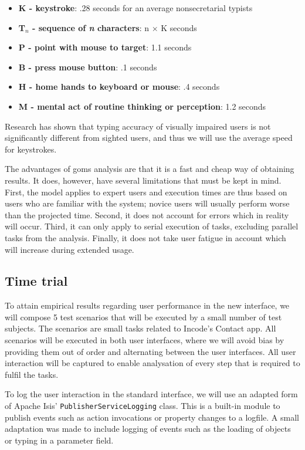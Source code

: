\begin{itemize}
	\item \textbf{K - keystroke}: .28 seconds for an average nonsecretarial typists
	\item \textbf{T$_n$ - sequence of \textit{n} characters}: n $\times$ K seconds
	\item \textbf{P - point with mouse to target}: 1.1 seconds
	\item \textbf{B - press mouse button}: .1 seconds
	\item \textbf{H - home hands to keyboard or mouse}: .4 seconds
	\item \textbf{M - mental act of routine thinking or perception}: 1.2 seconds
\end{itemize}

Research has shown that typing accuracy of visually impaired users is not significantly different from sighted users\cite{ishida1993accuracy}, and thus we will use the average speed for keystrokes.

The advantages of \acrshort{goms} analysis are that it is a fast and cheap way of obtaining results. It does, however, have several limitations that must be kept in mind\cite{schrepp1990goms}. First, the model applies to expert users and execution times are thus based on users who are familiar with the system; novice users will usually perform worse than the projected time. Second, it does not account for errors which in reality will occur. Third, it can only apply to serial execution of tasks, excluding parallel tasks from the analysis. Finally, it does not take user fatigue in account which will increase during extended usage.

\subsection{Time trial}
\label{subsection:timetrial_methods}
To attain empirical results regarding user performance in the new interface, we will compose 5 test scenarios that will be executed by a small number of test subjects. The scenarios are small tasks related to Incode's Contact app\cite{incod72:online}. All scenarios will be executed in both user interfaces, where we will avoid bias by providing them out of order and alternating between the user interfaces\cite{chen2007comparing}. All user interaction will be captured to enable analysation of every step that is required to fulfil the tasks.

To log the user interaction in the standard interface, we will use an adapted form of Apache Isis' \texttt{PublisherServiceLogging} class. This is a built-in module to publish events such as action invocations or property changes to a logfile. A small adaptation was made to include logging of events such as the loading of objects or typing in a parameter field.

